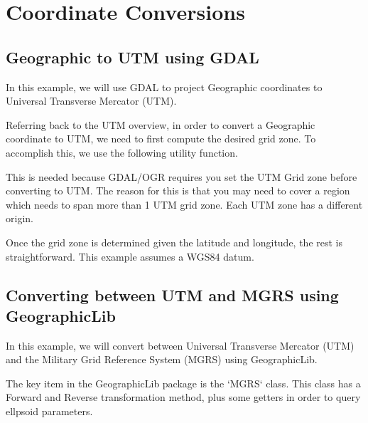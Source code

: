 %



\section*{Coordinate Conversions}


\subsection*{Geographic to UTM using GDAL}

In this example, we will use GDAL to project Geographic coordinates to Universal Transverse
Mercator (UTM).  

Referring back to the UTM overview, in order to convert a Geographic coordinate
to UTM, we need to first compute the desired grid zone.  To accomplish this, we use
the following utility function. 



This is needed because GDAL/OGR requires you set the UTM Grid zone before converting to UTM.  
The reason for this is that you may need to cover a region which needs to span more than 1 UTM grid zone.
Each UTM zone has a different origin.

Once the grid zone is determined given the latitude and longitude, the rest is straightforward.  This example
assumes a WGS84 datum. 




\subsection*{Converting between UTM and MGRS using GeographicLib}

In this example, we will convert between Universal Transverse Mercator (UTM) and the Military Grid Reference System (MGRS)
using GeographicLib. 

The key item in the GeographicLib package is the `MGRS` class.  This class has a Forward and Reverse 
transformation method, plus some getters in order to query ellpsoid parameters. 






